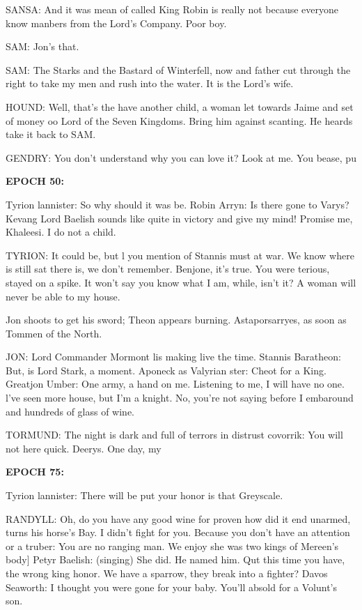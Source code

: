 \documentclass[11pt,a4paper]{article}
\begin{document}
SANSA: And it was mean of called King Robin is really not because everyone know manbers from the Lord's Company. Poor boy.

SAM: Jon's that.

SAM: The Starks and the Bastard of Winterfell, now and father cut through the right to take my men and rush into the water. It is the Lord's wife.

HOUND: Well, that's the have another child, a woman let towards Jaime and set of money oo Lord of the Seven Kingdoms. Bring him against scanting. He heards take it back to SAM.

GENDRY: You don't understand why you can love it? Look at me. You bease, pu\newline 

\textbf{EPOCH 50:}\newline 

Tyrion lannister: So why should it was be.
Robin Arryn: Is there gone to Varys? Kevang Lord Baelish sounds like quite in victory and give my mind! Promise me, Khaleesi. I do not a child.

TYRION: It could be, but l you mention of Stannis must at war. We know where is still sat there is, we don't remember. Benjone, it's true. You were terious, stayed on a spike. It won't say you know what I am, while, isn't it? A woman will never be able to my house.

Jon shoots to get his sword; Theon appears burning. Astaporsarryes, as soon as Tommen of the North.

JON: Lord Commander Mormont lis making live the time.
Stannis Baratheon: But, is Lord Stark, a moment.
Aponeck as Valyrian ster: Cheot for a King.
Greatjon Umber: One army, a hand on me. Listening to me, I will have no one. l've seen more house, but I'm a knight. No, you're not saying before I embaround and hundreds of glass of wine.

TORMUND: The night is dark and full of terrors in distrust covorrik: You will not here quick. Deerys. One day, my\newline 

\textbf{EPOCH 75:}\newline 

Tyrion lannister: There will be put your honor is that Greyscale.

RANDYLL: Oh, do you have any good wine for proven how did it end unarmed, turns his horse's Bay. I didn’t fight for you. Because you don't have an attention or a truber: You are no ranging man. We enjoy she was two kings of Mereen's body]
Petyr Baelish: (singing) She did.
He named him.
Qut this time you have, the wrong king honor. We have a sparrow, they break into a fighter?
Davos Seaworth: I thought you were gone for your baby. You'll absold for a Volunt's son.
\end{document}
